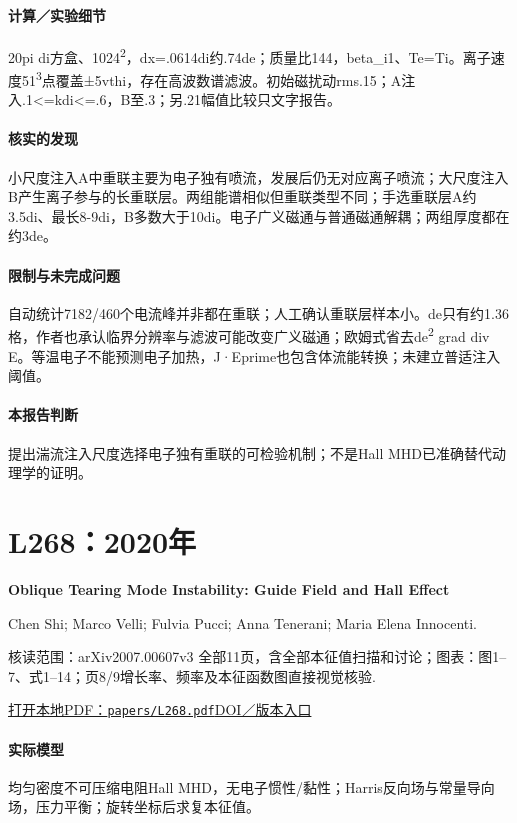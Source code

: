 \paragraph{计算／实验细节}20pi di方盒、1024\textsuperscript{2}，dx=.0614di约.74de；质量比144，beta\_i1、Te=Ti。离子速度51\textsuperscript{3}点覆盖±5vthi，存在高波数谱滤波。初始磁扰动rms.15；A注入.1<=kdi<=.6，B至.3；另.21幅值比较只文字报告。

\paragraph{核实的发现}小尺度注入A中重联主要为电子独有喷流，发展后仍无对应离子喷流；大尺度注入B产生离子参与的长重联层。两组能谱相似但重联类型不同；手选重联层A约3.5di、最长8-9di，B多数大于10di。电子广义磁通与普通磁通解耦；两组厚度都在约3de。

\paragraph{限制与未完成问题}自动统计7182/460个电流峰并非都在重联；人工确认重联层样本小。de只有约1.36格，作者也承认临界分辨率与滤波可能改变广义磁通；欧姆式省去de\textsuperscript{2} grad div E。等温电子不能预测电子加热，J·Eprime也包含体流能转换；未建立普适注入阈值。

\paragraph{本报告判断}提出湍流注入尺度选择电子独有重联的可检验机制；不是Hall MHD已准确替代动理学的证明。

\section{L268：2020年}\label{paper:L268}

\textbf{Oblique Tearing Mode Instability: Guide Field and Hall Effect}\citep{L268}\

Chen Shi;  Marco Velli;  Fulvia Pucci;  Anna Tenerani;  Maria Elena Innocenti.

\textsf{核读范围：}arXiv2007.00607v3 全部11页，含全部本征值扫描和讨论；\textsf{图表：}图1–7、式1–14；页8/9增长率、频率及本征函数图直接视觉核验.

\href{run:papers/L268.pdf}{打开本地PDF：\texttt{papers/L268.pdf}}\quad\href{https://doi.org/10.3847/1538-4357/abb6fa}{DOI／版本入口}

\paragraph{实际模型}均匀密度不可压缩电阻Hall MHD，无电子惯性/黏性；Harris反向场与常量导向场，压力平衡；旋转坐标后求复本征值。

